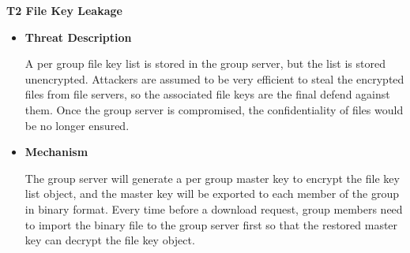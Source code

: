 \documentclass[letterpaper,11pt]{article}
\newlength{\arrow}
\newcommand{\resheading}[1]{{\large \colorbox{mygrey}{\begin{minipage}{\textwidth}{\textbf{#1 \vphantom{p\^{E}}}}\end{minipage}}}}
\begin{document}
\resheading{T2 File Key Leakage}
\vspace{0.1in}
\begin{itemize}[noitemsep,topsep=0pt,parsep=1pt,partopsep=1pt]
	\item\textbf{Threat Description}
	\begin{flushleft}
		A per group file key list is stored in the group server, but the list is stored unencrypted. Attackers are assumed to be very efficient to steal the encrypted files from file servers, so the associated file keys are the final defend against them. Once the group server is compromised, the confidentiality of files would be no longer ensured.       
	\end{flushleft}
	\item\textbf{Mechanism}
	\begin{flushleft}
		The group server will generate a per group master key to encrypt the file key list object, and the master key will be exported to each member of the group in binary format. Every time before a download request, group members need to import the binary file to the group server first so that the restored master key can decrypt the file key object. 
	\end{flushleft}

\end{itemize}
\end{document}
